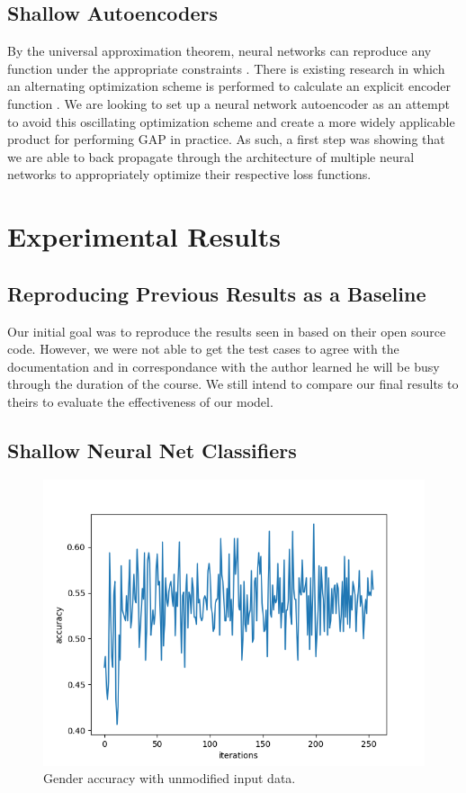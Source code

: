 \documentclass[10pt,twocolumn,letterpaper]{article}
\begin{document}
\subsection{Shallow Autoencoders}
By the universal approximation theorem, neural networks can reproduce any function under the appropriate constraints \cite{UA}. There is existing research in which an alternating optimization scheme is performed to calculate an explicit encoder function \cite{IA}. We are looking to set up a neural network autoencoder as an attempt to avoid this oscillating optimization scheme and create a more widely applicable product for performing GAP in practice. As such, a first step was showing that we are able to back propagate through the architecture of multiple neural networks to appropriately optimize their respective loss functions.  


\section{Experimental Results}
\subsection{Reproducing Previous Results as a Baseline}
Our initial goal was to reproduce the results seen in \cite{IA} based on their open source code. However, we were not able to get the test cases to agree with the documentation and in correspondance with the author learned he will be busy through the duration of the course. We still intend to compare our final results to theirs to evaluate the effectiveness of our model.

\subsection{Shallow Neural Net Classifiers}
\begin{figure}[h]
\includegraphics[width=\columnwidth]{gender_acc.png}
\centering
\caption{Gender accuracy with unmodified input data.}
\label{fig:gender_acc}
\end{figure}
\end{document}
